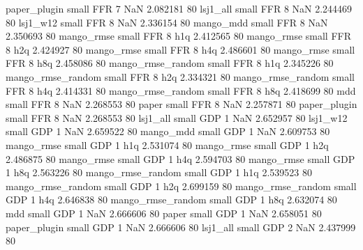      paper_plugin      small      FFR                 7                  NaN 2.082181 80
         lsj1_all      small      FFR                 8                  NaN 2.244469 80
         lsj1_w12      small      FFR                 8                  NaN 2.336154 80
        mango_mdd      small      FFR                 8                  NaN 2.350693 80
       mango_rmse      small      FFR                 8                  h1q 2.412565 80
       mango_rmse      small      FFR                 8                  h2q 2.424927 80
       mango_rmse      small      FFR                 8                  h4q 2.486601 80
       mango_rmse      small      FFR                 8                  h8q 2.458086 80
mango_rmse_random      small      FFR                 8                  h1q 2.345226 80
mango_rmse_random      small      FFR                 8                  h2q 2.334321 80
mango_rmse_random      small      FFR                 8                  h4q 2.414331 80
mango_rmse_random      small      FFR                 8                  h8q 2.418699 80
              mdd      small      FFR                 8                  NaN 2.268553 80
            paper      small      FFR                 8                  NaN 2.257871 80
     paper_plugin      small      FFR                 8                  NaN 2.268553 80
         lsj1_all      small      GDP                 1                  NaN 2.652957 80
         lsj1_w12      small      GDP                 1                  NaN 2.659522 80
        mango_mdd      small      GDP                 1                  NaN 2.609753 80
       mango_rmse      small      GDP                 1                  h1q 2.531074 80
       mango_rmse      small      GDP                 1                  h2q 2.486875 80
       mango_rmse      small      GDP                 1                  h4q 2.594703 80
       mango_rmse      small      GDP                 1                  h8q 2.563226 80
mango_rmse_random      small      GDP                 1                  h1q 2.539523 80
mango_rmse_random      small      GDP                 1                  h2q 2.699159 80
mango_rmse_random      small      GDP                 1                  h4q 2.646838 80
mango_rmse_random      small      GDP                 1                  h8q 2.632074 80
              mdd      small      GDP                 1                  NaN 2.666606 80
            paper      small      GDP                 1                  NaN 2.658051 80
     paper_plugin      small      GDP                 1                  NaN 2.666606 80
         lsj1_all      small      GDP                 2                  NaN 2.437999 80
